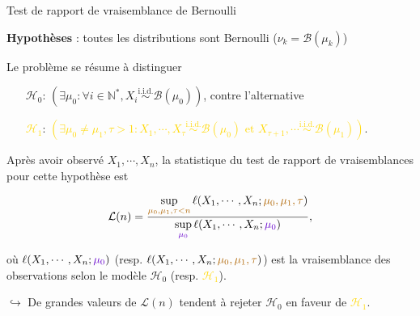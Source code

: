 \documentclass[11pt,french,ignorenonframetext,]{beamer}
\begin{document}
\begin{frame}{Test de rapport de vraisemblance de Bernoulli}

  \textbf{Hypothèses} : toutes les distributions sont Bernoulli ($\nu_k = \mathcal{B}(\mu_k)$)

  Le problème se résume à distinguer
  \begin{itemize}
    \item[\textcolor{deeppurple}{$\mathcal{H}_0$}:]
    \textcolor{deeppurple}{$(\exists \mu_0 : \forall i\in\mathbb{N}^*, X_i \overset{\text{i.i.d.}}{\sim} \mathcal{B}(\mu_0))$},
    contre l'alternative
    \item[\textcolor{gold}{$\mathcal{H}_1$}:]
    \textcolor{gold}{$(\exists \mu_0 \neq \mu_1, \tau > 1 : X_1, \cdots, X_\tau \overset{\text{i.i.d.}}{\sim} \mathcal{B}(\mu_0) \text{~et~} X_{\tau+1}, \cdots \overset{\text{i.i.d.}}{\sim} \mathcal{B}(\mu_1))$}.
  \end{itemize}

  \pause

  Après avoir observé $X_1,\cdots,X_n$, la statistique du \alert{test de rapport de vraisemblances} pour cette hypothèse est
  \begin{small}
    \[ \mathcal{L}(n) = \frac{\sup\limits_{\textcolor{gold}{\mu_0,\mu_1,\tau < n}}\ell(X_1,\cdots,X_n ; \textcolor{gold}{\mu_0,\mu_1,\tau})}{\sup\limits_{\textcolor{deeppurple}{\mu_0}}\ell(X_1,\cdots,X_n ;\textcolor{deeppurple}{\mu_0})},\]
  \end{small}

  où $\ell(X_1,\cdots,X_n ; \textcolor{deeppurple}{\mu_0})$ (resp. $\ell(X_1,\cdots,X_n ; \textcolor{gold}{\mu_0,\mu_1,\tau})$) est la vraisemblance des observations selon le modèle \textcolor{deeppurple}{$\mathcal{H}_0$} (resp. \textcolor{gold}{$\mathcal{H}_1$}).

  \pause

  \alert{$\hookrightarrow$ De grandes valeurs de $\mathcal{L}(n)$ tendent à rejeter \textcolor{deeppurple}{$\mathcal{H}_0$} en faveur de \textcolor{gold}{$\mathcal{H}_1$}.}

\end{frame}
\end{document}
